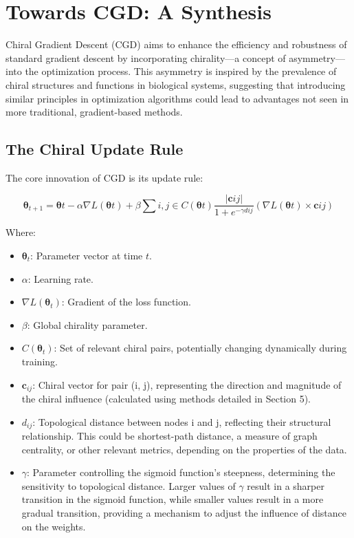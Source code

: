 \documentclass[12pt, a4paper]{article}
\begin{document}
\section{Towards CGD: A Synthesis}

Chiral Gradient Descent (CGD) aims to enhance the efficiency and robustness of standard gradient descent by incorporating chirality—a concept of asymmetry—into the optimization process. This asymmetry is inspired by the prevalence of chiral structures and functions in biological systems, suggesting that introducing similar principles in optimization algorithms could lead to advantages not seen in more traditional, gradient-based methods.

\subsection{The Chiral Update Rule}

The core innovation of CGD is its update rule:

\begin{equation} \label{eq:cgd_sigmoid_final}
\boldsymbol{\theta}_{t+1} = \boldsymbol{\theta}t - \alpha \nabla L(\boldsymbol{\theta}t) + \beta \sum{i,j \in C(\boldsymbol{\theta}t)} \frac{| \mathbf{c}{ij} |}{1 + e^{-\gamma d{ij}}} (\nabla L(\boldsymbol{\theta}t) \times \mathbf{c}{ij})
\end{equation}

Where:




\begin{itemize}
    \item \(\boldsymbol{\theta}_t\): Parameter vector at time \(t\).
    \item \(\alpha\): Learning rate.
    \item \(\nabla L(\boldsymbol{\theta}_t)\): Gradient of the loss function.
    \item \(\beta\): Global chirality parameter.
    \item \(C(\boldsymbol{\theta}_t)\): Set of relevant chiral pairs, potentially changing dynamically during training.
    \item \(\mathbf{c}_{ij}\): Chiral vector for pair (i, j), representing the direction and magnitude of the chiral influence (calculated using methods detailed in Section 5).
    \item \(d_{ij}\): Topological distance between nodes i and j, reflecting their structural relationship. This could be shortest-path distance, a measure of graph centrality, or other relevant metrics, depending on the properties of the data.
    \item \(\gamma\): Parameter controlling the sigmoid function’s steepness, determining the sensitivity to topological distance. Larger values of \(\gamma\) result in a sharper transition in the sigmoid function, while smaller values result in a more gradual transition, providing a mechanism to adjust the influence of distance on the weights.
\end{itemize}
\end{document}
